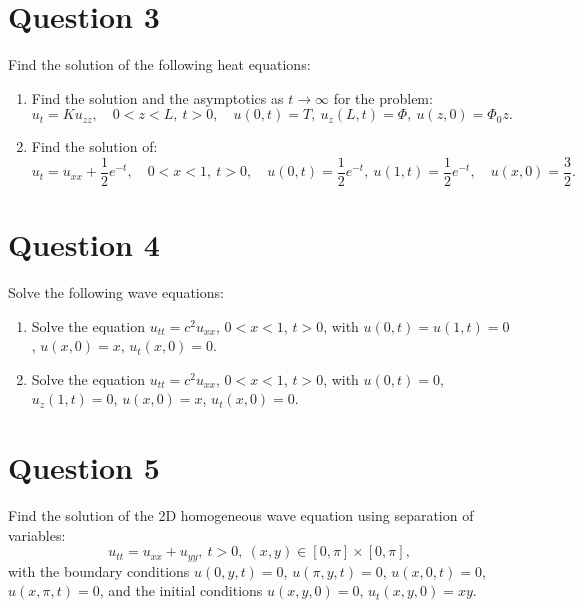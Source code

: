\documentclass[lang=en,11pt]{template}
\begin{document}
\section*{Question 3}
Find the solution of the following heat equations:
\begin{enumerate}
    \item Find the solution and the asymptotics as $t \to \infty$ for the problem:
    \[
    u_t = K u_{zz}, \quad 0 < z < L, \ t > 0, \quad u(0, t) = T, \ u_z(L, t) = \Phi, \ u(z, 0) = \Phi_0 z.
    \]
    \item Find the solution of:
    \[
    u_t = u_{xx} + \frac{1}{2}e^{-t}, \quad 0 < x < 1, \ t > 0, \quad u(0, t) = \frac{1}{2}e^{-t}, \ u(1, t) = \frac{1}{2}e^{-t}, \quad u(x, 0) = \frac{3}{2}.
    \]
\end{enumerate}

\section*{Question 4}
Solve the following wave equations:
\begin{enumerate}
    \item Solve the equation $u_{tt} = c^2 u_{xx}$, $0 < x < 1$, $t > 0$, with $u(0, t) = u(1, t) = 0$, $u(x, 0) = x$, $u_t(x, 0) = 0$.
    \item Solve the equation $u_{tt} = c^2 u_{xx}$, $0 < x < 1$, $t > 0$, with $u(0, t) = 0$, $u_z(1, t) = 0$, $u(x, 0) = x$, $u_t(x, 0) = 0$.
\end{enumerate}

\section*{Question 5}
Find the solution of the 2D homogeneous wave equation using separation of variables:
\[
u_{tt} = u_{xx} + u_{yy}, \ t > 0, \ (x, y) \in [0, \pi] \times [0, \pi],
\]
with the boundary conditions $u(0, y, t) = 0$, $u(\pi, y, t) = 0$, $u(x, 0, t) = 0$, $u(x, \pi, t) = 0$, and the initial conditions $u(x, y, 0) = 0$, $u_t(x, y, 0) = xy$.
\end{document}
